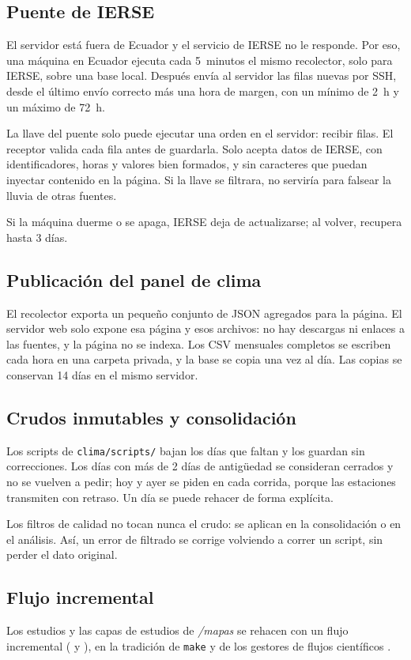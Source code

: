 \documentclass{sosg-informe}
\begin{document}
\subsection{Puente de IERSE}
El servidor está fuera de Ecuador y el servicio de IERSE no le responde. Por eso, una máquina en Ecuador ejecuta cada 5~minutos el mismo recolector, solo para IERSE, sobre una base local. Después envía al servidor las filas nuevas por SSH, desde el último envío correcto más una hora de margen, con un mínimo de 2~h y un máximo de 72~h.

La llave del puente solo puede ejecutar una orden en el servidor: recibir filas. El receptor valida cada fila antes de guardarla. Solo acepta datos de IERSE, con identificadores, horas y valores bien formados, y sin caracteres que puedan inyectar contenido en la página. Si la llave se filtrara, no serviría para falsear la lluvia de otras fuentes.

Si la máquina duerme o se apaga, IERSE deja de actualizarse; al volver, recupera hasta 3 días.

\subsection{Publicación del panel de clima}
El recolector exporta un pequeño conjunto de JSON agregados para la página. El servidor web solo expone esa página y esos archivos: no hay descargas ni enlaces a las fuentes, y la página no se indexa. Los CSV mensuales completos se escriben cada hora en una carpeta privada, y la base se copia una vez al día. Las copias se conservan 14 días en el mismo servidor.

\subsection{Crudos inmutables y consolidación}
Los scripts de \texttt{clima/scripts/} bajan los días que faltan y los guardan sin correcciones. Los días con más de 2 días de antigüedad se consideran cerrados y no se vuelven a pedir; hoy y ayer se piden en cada corrida, porque las estaciones transmiten con retraso. Un día se puede rehacer de forma explícita.

Los filtros de calidad no tocan nunca el crudo: se aplican en la consolidación o en el análisis. Así, un error de filtrado se corrige volviendo a correr un script, sin perder el dato original.

\subsection{Flujo incremental}\label{sec:flujo}
Los estudios y las capas de estudios de \emph{/mapas} se rehacen con un flujo incremental ( y ), en la tradición de \texttt{make} \citep{feldman1979} y de los gestores de flujos científicos \citep{koster2012}.
\end{document}
